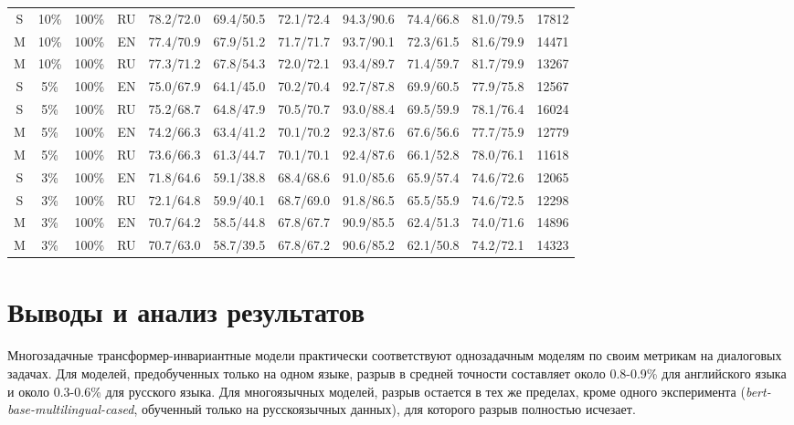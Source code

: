 \begin{table*}
{\begin{tabular}{|c|c|c|c||c|c|c|c|c|c||c|}
 S & 10\% & 100\% & RU & 78.2/72.0 & 69.4/50.5 & 72.1/72.4 & 94.3/90.6 & 74.4/66.8 & 81.0/79.5 & 17812 \\
M & 10\% & 100\% & EN & 77.4/70.9 & 67.9/51.2 & 71.7/71.7 & 93.7/90.1 & 72.3/61.5 & 81.6/79.9 & 14471 \\
M & 10\% & 100\% & RU & 77.3/71.2 & 67.8/54.3 & 72.0/72.1 & 93.4/89.7 & 71.4/59.7 & 81.7/79.9 & 13267 \\ \hline
 S & 5\% & 100\% & EN & 75.0/67.9 & 64.1/45.0 & 70.2/70.4 & 92.7/87.8 & 69.9/60.5 & 77.9/75.8 & 12567 \\
S & 5\% & 100\% & RU & 75.2/68.7 & 64.8/47.9 & 70.5/70.7 & 93.0/88.4 & 69.5/59.9 & 78.1/76.4 & 16024 \\
M & 5\% & 100\% & EN & 74.2/66.3 & 63.4/41.2 & 70.1/70.2 & 92.3/87.6 & 67.6/56.6 & 77.7/75.9 & 12779 \\
M & 5\% & 100\% & RU & 73.6/66.3 & 61.3/44.7 & 70.1/70.1 & 92.4/87.6 & 66.1/52.8 & 78.0/76.1 & 11618 \\ \hline
 S & 3\% & 100\% & EN & 71.8/64.6 & 59.1/38.8 & 68.4/68.6 & 91.0/85.6 & 65.9/57.4 & 74.6/72.6 & 12065 \\
 S & 3\% & 100\% & RU & 72.1/64.8 & 59.9/40.1 & 68.7/69.0 & 91.8/86.5 & 65.5/55.9 & 74.6/72.5 & 12298 \\
 M & 3\% & 100\% & EN & 70.7/64.2 & 58.5/44.8 & 67.8/67.7 & 90.9/85.5 & 62.4/51.3 & 74.0/71.6 & 14896 \\
M & 3\% & 100\% & RU & 70.7/63.0 & 58.7/39.5 & 67.8/67.2 & 90.6/85.2 & 62.1/50.8 & 74.2/72.1 & 14323 \\ \hline \end{tabular} } \end{table*} 


\section{Выводы и анализ результатов}\label{ch:tr-ag:discussion_conclusion}
Многозадачные трансформер-инвариантные модели практически соответствуют однозадачным моделям по своим метрикам на диалоговых задачах. Для моделей, предобученных только на одном языке, разрыв в средней точности составляет около 0.8-0.9\% для английского языка и около 0.3-0.6\% для русского языка. Для многоязычных моделей, разрыв остается в тех же пределах, кроме одного эксперимента (\textit{bert-base-multilingual-cased}, обученный только на русскоязычных данных), для которого разрыв полностью исчезает.

